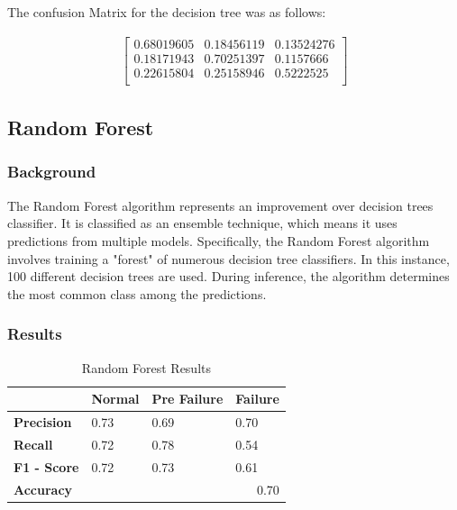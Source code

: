 \documentclass{article}
\begin{document}
The confusion Matrix for the decision tree was as follows:

\begin{align*}
\begin{bmatrix}
0.68019605 & 0.18456119 & 0.13524276 \\
0.18171943 & 0.70251397 & 0.1157666 \\
0.22615804 & 0.25158946 & 0.5222525 \\
\end{bmatrix}
\end{align*}

\subsection{Random Forest}
\subsubsection{Background}

The Random Forest algorithm represents an improvement over  decision trees classifier. It is classified as an ensemble technique, which means it uses predictions from multiple models. Specifically, the Random Forest algorithm involves training a "forest" of numerous decision tree classifiers. In this instance, 100 different decision trees are used. During inference, the algorithm determines the most common class among the predictions.

\subsubsection{Results}

\begin{table}[htbp]
\centering
\caption{Random Forest Results}
\begin{tabular}{|l|lll|}
\hline
                    & \multicolumn{1}{l|}{\textbf{Normal}} & \multicolumn{1}{l|}{\textbf{Pre Failure}} & \textbf{Failure} \\ \hline
\textbf{Precision}  & \multicolumn{1}{l|}{0.73}            & \multicolumn{1}{l|}{0.69}                 & 0.70             \\ \hline
\textbf{Recall}     & \multicolumn{1}{l|}{0.72}            & \multicolumn{1}{l|}{0.78}                 & 0.54             \\ \hline
\textbf{F1 - Score} & \multicolumn{1}{l|}{0.72}            & \multicolumn{1}{l|}{0.73}                 & 0.61             \\ \hline
\textbf{Accuracy}   & \multicolumn{3}{r|}{0.70}                                                                           \\ \hline
\end{tabular}
\end{table}
\end{document}
